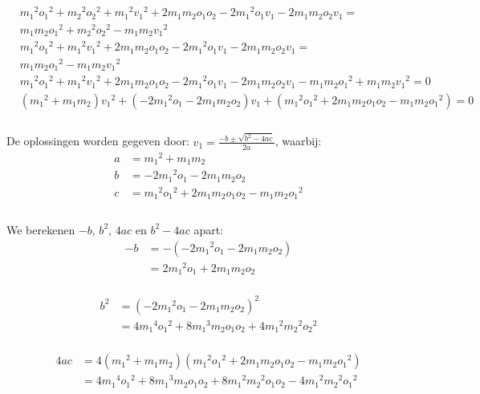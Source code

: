 \documentclass[12pt,a4paper]{article}
\begin{document}
	\begin{equation}
		\begin{aligned}
			&{m_1}^2{o_1}^2 + {m_2}^2{o_2}^2 + {m_1}^2{v_1}^2 + 2m_1m_2o_1o_2 - 2{m_1}^2o_1v_1 - 2m_1m_2o_2v_1 =\\
			&m_1m_2{o_1}^2 + {m_2}^2{o_2}^2 - m_1m_2{v_1}^2\\
			&{m_1}^2{o_1}^2 + {m_1}^2{v_1}^2 + 2m_1m_2o_1o_2 - 2{m_1}^2o_1v_1 - 2m_1m_2o_2v_1 =\\
			&m_1m_2{o_1}^2 - m_1m_2{v_1}^2\\
			&{m_1}^2{o_1}^2 + {m_1}^2{v_1}^2 + 2m_1m_2o_1o_2 - 2{m_1}^2o_1v_1 - 2m_1m_2o_2v_1 - m_1m_2{o_1}^2 + m_1m_2{v_1}^2 = 0\\
			&\left({m_1}^2+m_1m_2\right){v_1}^2+\left(-2{m_1}^2o_1-2m_1m_2o_2\right)v_1+\left({m_1}^2{o_1}^2+2m_1m_2o_1o_2-m_1m_2{o_1}^2\right) = 0\\
		\end{aligned}
	\end{equation}
	\\De oplossingen worden gegeven door: $v_1=\frac{-b\pm\sqrt{b^2-4ac}}{2a}$, waarbij:
	\begin{equation}
		\begin{aligned}
			a &= {m_1}^2+m_1m_2\\
			b &= -2{m_1}^2o_1-2m_1m_2o_2\\
			c &= {m_1}^2{o_1}^2+2m_1m_2o_1o_2-m_1m_2{o_1}^2\\
		\end{aligned}
	\end{equation}
	\\We berekenen $-b$, $b^2$, $4ac$ en $b^2-4ac$ apart:
	\begin{equation}
		\begin{aligned}
			-b&=-\left(-2{m_1}^2o_1-2m_1m_2o_2\right)\\
			&=2{m_1}^2o_1+2m_1m_2o_2\\
		\end{aligned}
	\end{equation}

	\begin{equation}
		\begin{aligned}
			b^2&=\left(-2{m_1}^2o_1-2m_1m_2o_2\right)^2\\
			&=4{m_1}^4{o_1}^2+8{m_1}^3m_2o_1o_2+4{m_1}^2{m_2}^2{o_2}^2\\
		\end{aligned}
	\end{equation}

	\begin{equation}
		\begin{aligned}
			4ac&=4\left({m_1}^2+m_1m_2\right)\left({m_1}^2{o_1}^2+2m_1m_2o_1o_2-m_1m_2{o_1}^2\right)\\
			&=4{m_1}^4{o_1}^2+8{m_1}^3m_2o_1o_2+8{m_1}^2{m_2}^2o_1o_2-4{m_1}^2{m_2}^2{o_1}^2\\
		\end{aligned}
	\end{equation}
\end{document}
